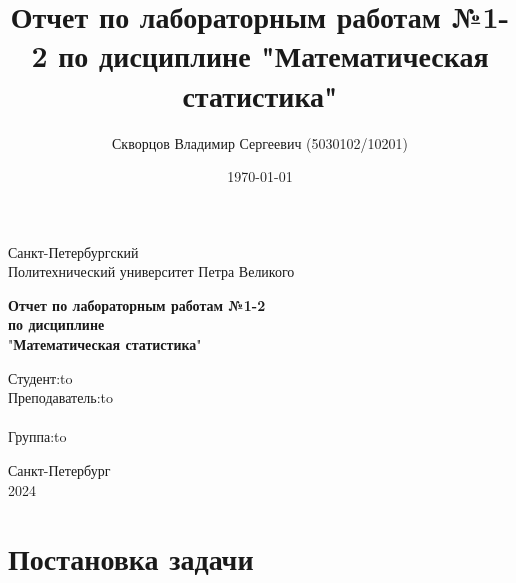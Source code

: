 \documentclass[12pt,a4paper]{article}
\title{Отчет по лабораторным работам №1-2 по дисциплине "Математическая статистика"}
\author{Скворцов Владимир Сергеевич (5030102/10201)}
\date{\today}
\begin{document}
	\begin{titlepage}

		\Large

		\begin{center}
			Санкт-Петербургский \\ Политехнический университет Петра Великого

			\vspace{10em}

			\textbf{Отчет по лабораторным работам №1-2} \\
			\textbf{по дисциплине}\\
			"\textbf{Математическая статистика}"

			\vspace{2em}

		\end{center}

		\vspace{6em}

		\newbox{\lbox}
		\newlength{\maxl}
		\setlength{\maxl}{\wd\lbox}
		\hfill\parbox{12cm}{
			\hspace*{3cm}\hspace*{-5cm}Студент:\hfill\hbox to\\
			\hspace*{3cm}\hspace*{-5cm}Преподаватель:\hfill\hbox to\\
			\\
			\hspace*{3cm}\hspace*{-5cm}Группа:\hfill\hbox to\\
		}

		\vspace{\fill}

		\begin{center}
			Санкт-Петербург \\ 2024
		\end{center}

	\end{titlepage}

	\tableofcontents\newpage

	\section{Постановка задачи}
\end{document}
